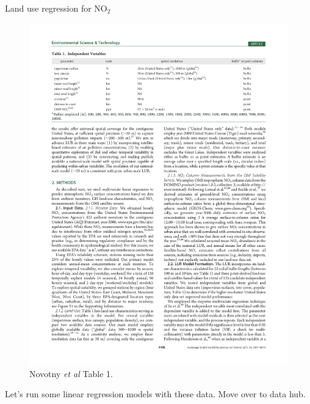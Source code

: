 \documentclass[aspectratio=169]{beamer}
\begin{document}
\begin{frame}{Land use regression for NO$_2$}
\begin{figure}
\includegraphics[height=0.6\textheight]{novotny_tab1_4}
\caption*{Novotny \textit{et al} Table 1.  }
\end{figure}

\end{frame}


\begin{frame}{}
	Let's run some linear regression models with these data.  Move over to data hub.

\end{frame}
\end{document}

